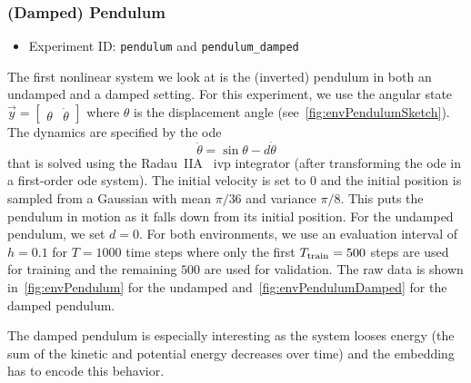 		\subsubsection{(Damped) Pendulum}
			\begin{itemize}
				\item Experiment ID: \texttt{pendulum} and \texttt{pendulum\_damped}
			\end{itemize}

			The first nonlinear system we look at is the (inverted) pendulum in both an undamped and a damped setting. For this experiment, we use the angular state \( \vec{y} = \begin{bmatrix} \theta & \dot{\theta} \end{bmatrix} \) where \(\theta\) is the displacement angle (see~\autoref{fig:envPendulumSketch}). The dynamics are specified by the \ac{ode}
			\begin{equation*}
				\ddot{\theta} = \sin\theta - d \dot{\theta}
			\end{equation*}
			that is solved using the Radau~IIA~\cite{guglielmiImplementingRadauIIA2001} \ac{ivp} integrator (after transforming the \ac{ode} in a first-order \ac{ode} system). The initial velocity is set to \(0\) and the initial position is sampled from a Gaussian with mean \( \pi/36 \) and variance \( \pi/8 \). This puts the pendulum in motion as it falls down from its initial position. For the undamped pendulum, we set \( d = 0 \). For both environments, we use an evaluation interval of \( h = 0.1 \) for \( T = 1000 \) time steps where only the first \( T_{\mathrm{train}} = 500 \) steps are used for training and the remaining \(500\) are used for validation. The raw data is shown in~\autoref{fig:envPendulum} for the undamped and~\autoref{fig:envPendulumDamped} for the damped pendulum.

			The damped pendulum is especially interesting as the system looses energy (\ie the sum of the kinetic and potential energy decreases over time) and the embedding has to encode this behavior.

